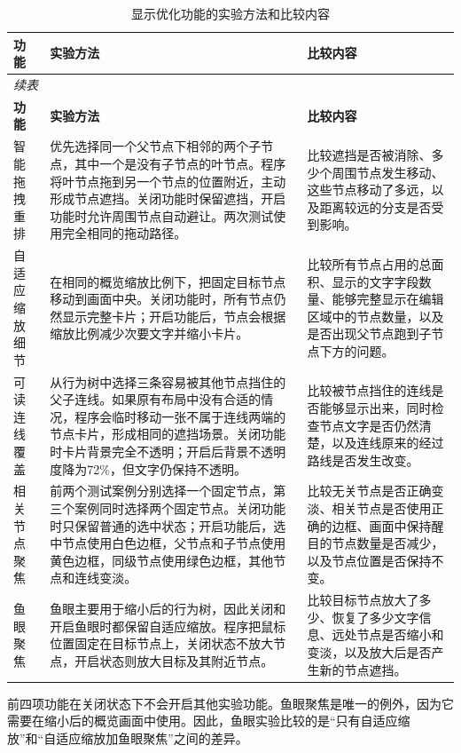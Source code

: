 \documentclass[11pt,a4paper,oneside,extrafontsizes]{memoir}
\begin{document}
\begin{center}
\small
\begin{longtable}{@{}p{} p{} p{}@{}}
\caption{显示优化功能的实验方法和比较内容}\label{tab:auto-3}\\
\toprule
\textbf{功能} & \textbf{实验方法} & \textbf{比较内容} \\
\midrule
\endfirsthead
\multicolumn{3}{l}{\small\itshape 续表}\\
\toprule
\textbf{功能} & \textbf{实验方法} & \textbf{比较内容} \\
\midrule
\endhead
智能拖拽重排 & 优先选择同一个父节点下相邻的两个子节点，其中一个是没有子节点的叶节点。程序将叶节点拖到另一个节点的位置附近，主动形成节点遮挡。关闭功能时保留遮挡，开启功能时允许周围节点自动避让。两次测试使用完全相同的拖动路径。 & 比较遮挡是否被消除、多少个周围节点发生移动、这些节点移动了多远，以及距离较远的分支是否受到影响。 \\
自适应缩放细节 & 在相同的概览缩放比例下，把固定目标节点移动到画面中央。关闭功能时，所有节点仍然显示完整卡片；开启功能后，节点会根据缩放比例减少次要文字并缩小卡片。 & 比较所有节点占用的总面积、显示的文字字段数量、能够完整显示在编辑区域中的节点数量，以及是否出现父节点跑到子节点下方的问题。 \\
可读连线覆盖 & 从行为树中选择三条容易被其他节点挡住的父子连线。如果原有布局中没有合适的情况，程序会临时移动一张不属于连线两端的节点卡片，形成相同的遮挡场景。关闭功能时卡片背景完全不透明；开启后背景不透明度降为72\%，但文字仍保持不透明。 & 比较被节点挡住的连线是否能够显示出来，同时检查节点文字是否仍然清楚，以及连线原来的经过路线是否发生改变。 \\
相关节点聚焦 & 前两个测试案例分别选择一个固定节点，第三个案例同时选择两个固定节点。关闭功能时只保留普通的选中状态；开启功能后，选中节点使用白色边框，父节点和子节点使用黄色边框，同级节点使用绿色边框，其他节点和连线变淡。 & 比较无关节点是否正确变淡、相关节点是否使用正确的边框、画面中保持醒目的节点数量是否减少，以及节点位置是否保持不变。 \\
鱼眼聚焦 & 鱼眼主要用于缩小后的行为树，因此关闭和开启鱼眼时都保留自适应缩放。程序把鼠标位置固定在目标节点上，关闭状态不放大节点，开启状态则放大目标及其附近节点。 & 比较目标节点放大了多少、恢复了多少文字信息、远处节点是否缩小和变淡，以及放大后是否产生新的节点遮挡。 \\
\bottomrule
\end{longtable}
\end{center}

前四项功能在关闭状态下不会开启其他实验功能。鱼眼聚焦是唯一的例外，因为它需要在缩小后的概览画面中使用。因此，鱼眼实验比较的是“只有自适应缩放”和“自适应缩放加鱼眼聚焦”之间的差异。
\end{document}
